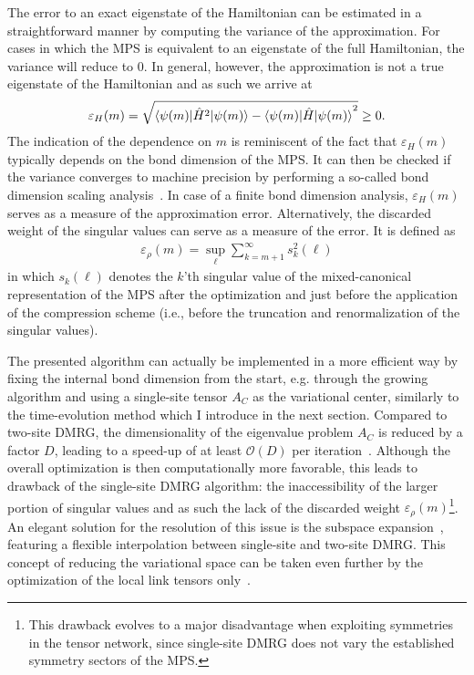 The error to an exact eigenstate of the Hamiltonian can be estimated in a straightforward manner by computing the variance of the approximation.
For cases in which the MPS is equivalent to an eigenstate of the full Hamiltonian, the variance will reduce to $0$. In general, however, the approximation is not a true eigenstate of the Hamiltonian and as such we arrive at
\begin{align}
    \varepsilon_H(m) = \sqrt{\braket{\psi(m)|\hat H^2|\psi(m)} - \braket{\psi(m)|\hat H|\psi(m)}^2}\geq 0.
\end{align}
The indication of the dependence on $m$ is reminiscent of the fact that $\varepsilon_H(m)$ typically depends on the bond dimension of the MPS.
It can then be checked if the variance converges to machine precision by performing a so-called bond dimension scaling analysis~\cite{Hubig2018}.
In case of a finite bond dimension analysis, $\varepsilon_H(m)$ serves as a measure of the approximation error.
Alternatively, the discarded weight of the singular values can serve as a measure of the error.
It is defined as
\begin{align}
    \varepsilon_\rho(m) = \sup_{\ell}\sum_{k=m+1}^\infty s_k^2(\ell)
\end{align}
in which $s_k(\ell)$ denotes the $k$'th singular value of the mixed-canonical representation of the MPS after the optimization and just before the application of the compression scheme (i.e., before the truncation and renormalization of the singular values).

The presented algorithm can actually be implemented in a more efficient way by fixing the internal bond dimension from the start, e.g. through the growing algorithm and using a single-site tensor $A_C$ as the variational center, similarly to the time-evolution method which I introduce in the next section.
Compared to two-site DMRG, the dimensionality of the eigenvalue problem $A_C$ is reduced by a factor $D$, leading to a speed-up of at least $\mathcal O(D)$ per iteration~\cite{White2005}.
Although the overall optimization is then computationally more favorable, this leads to drawback of the single-site DMRG algorithm: the inaccessibility of the larger portion of singular values and as such the lack of the discarded weight $\varepsilon_\rho(m)$\footnote{This drawback evolves to a major disadvantage when exploiting symmetries in the tensor network, since single-site DMRG does not vary the established symmetry sectors of the MPS.}.
An elegant solution for the resolution of this issue is the subspace expansion~\cite{Hubig2015}, featuring a flexible interpolation between single-site and two-site DMRG.
This concept of reducing the variational space can be taken even further by the optimization of the local link tensors only~\cite{Fernandez2020}.
%
%
